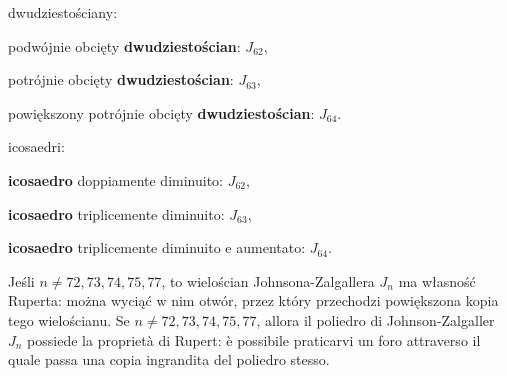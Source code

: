 \begin{compactitem}
\begin{compactitem}
\begin{compactitem}
\begin{compactitem}
\begin{compactitem}
\begin{compactitem}
\begin{compactitem}
\begin{compactitem}
\begin{compactitem}
\begin{compactitem}
\begin{compactitem}
    \item dwudziestościany: \begin{compactitem} %
        \item podwójnie obcięty \textbf{dwudziestościan}: $J_{62}$, %
        \item potrójnie obcięty \textbf{dwudziestościan}: $J_{63}$, %
        \item powiększony potrójnie obcięty \textbf{dwudziestościan}: $J_{64}$. %
    \item icosaedri: \begin{compactitem} %
        \item \textbf{icosaedro} doppiamente diminuito: $J_{62}$, %
        \item \textbf{icosaedro} triplicemente diminuito: $J_{63}$, %
        \item \textbf{icosaedro} triplicemente diminuito e aumentato: $J_{64}$. %
    \end{compactitem}
\end{compactitem}

\begin{proposition}
    Jeśli $n \neq 72, 73, 74, 75, 77$, to wielościan Johnsona-Zalgallera $J_{n}$ ma własność Ruperta: można wyciąć w nim otwór, przez który przechodzi powiększona kopia tego wielościanu. %
    Se $n \neq 72, 73, 74, 75, 77$, allora il poliedro di Johnson-Zalgaller $J_{n}$ possiede la proprietà di Rupert: è possibile praticarvi un foro attraverso il quale passa una copia ingrandita del poliedro stesso. %
\end{proposition}


\end{compactitem}
\end{compactitem}
\end{compactitem}
\end{compactitem}
\end{compactitem}
\end{compactitem}
\end{compactitem}
\end{compactitem}
\end{compactitem}
\end{compactitem}
\end{compactitem}
